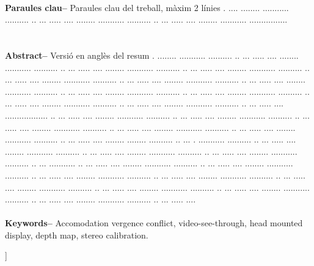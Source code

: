 \documentclass[10pt,a4paper,twocolumn,twoside]{article}
\begin{document}
\begin{@twocolumnfalse}
\begin{center}
{	\\
	\textbf{Paraules clau-- } Paraules clau del treball, màxim 2 línies . .... ........ ........... .......... ..  ... ..... .... ........ ........... .......... ..  ... ..... .... ........ ........... ................\\
	\\
	\bigskip
	\\
	\textbf{Abstract--} Versió en anglès del resum . ........ ........... .......... ..  ... ..... .... ........ ........... .......... ..  ... ..... .... ........ ........... .......... ..  ... ..... .... ........ ........... .......... ..  ... ..... .... ........ ........... .......... ..  ... ..... .... ........ ........... .......... ..  ... ..... .... ........ ........... .......... ..  ... ..... .... ........ ........... .......... ..  ... ..... .... ........ ........... .......... ..  ... ..... .... ........ ........... .......... ..  ... ..... .... ........ ........... .......... ..  ... ..... .... .................. ..  ... ..... .... ........ ........... .......... ..  ... ..... .... ........ ........... .......... ..  ... ..... .... ........ ........... .......... ..  ... ..... .... ........ ........... .......... ..  ... ..... .... ........ ........... .......... ..  ... ..... .... ........ ........ .......... ..  ... . ........... .......... ..  ... ..... .... ........ ........... .......... ..  ... ..... .... ........ ........... .......... ..  ... ..... .... ........ ........... .......... ..  ... ........... ..  ... ..... .... ........ ........... .......... ..  ... ..... .... ........ ........... .......... ..  ... ..... .... ........ ........... .......... ..  ... ..... .... ........ ........... .......... ..  ... ..... .... ........ ........... .......... ..  ... ..... .... ........ ........... .......... ..  ... ..... .... ........ ........... .......... ..  ... ..... .... ........ ........... .......... ..  ... ..... .... 
	\\
	\\
	\textbf{Keywords-- } Accomodation vergence conflict, video-see-through, head mounted display, depth map, stereo calibration. 
	}
	
	\bigskip
	
	{\vrule depth 0pt height 0.5pt width 4cm\hspace{7.5pt}%
	\hspace{7.5pt}\vrule depth 0pt height 0.5pt width 4cm\relax}
	
	\end{center}
	
	\bigskip
	\end{@twocolumnfalse}]
	
\end{document}
